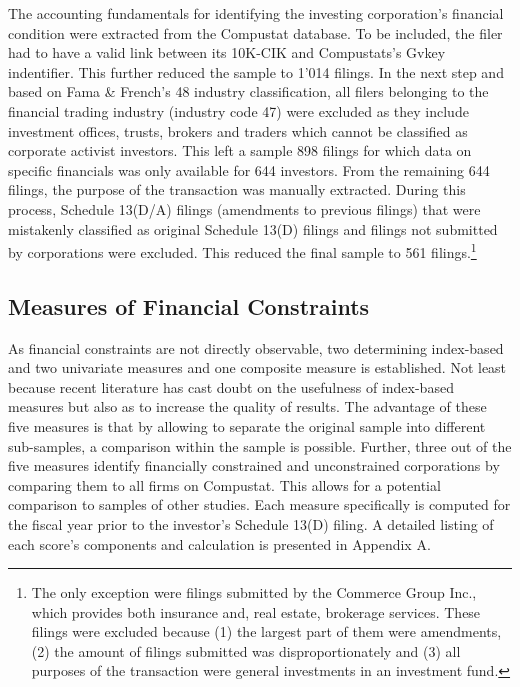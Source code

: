 \documentclass[12pt]{article}
\begin{document}
The accounting fundamentals for identifying the investing corporation's financial condition were extracted from the Compustat database. To be included, the filer had to have a valid link between its 10K-CIK and Compustats's Gvkey indentifier. This further reduced the sample to 1'014 filings. In the next step and based on Fama \& French's 48 industry classification, all filers belonging to the financial trading industry (industry code 47) were excluded as they include investment offices, trusts, brokers and traders which cannot be classified as corporate activist investors. This left a sample 898 filings for which data on specific financials was only available for 644 investors. From the remaining 644 filings, the purpose of the transaction was manually extracted. During this process, Schedule 13(D/A) filings (amendments to previous filings) that were mistakenly classified as original Schedule 13(D) filings and filings not submitted by corporations were excluded. This reduced the final sample to 561 filings.\footnote{The only exception were filings submitted by the Commerce Group Inc., which provides both insurance and, real estate, brokerage services. These filings were excluded because (1) the largest part of them were amendments, (2) the amount of filings submitted was disproportionately and (3) all purposes of the transaction were general investments in an investment fund.} 

\subsection{Measures of Financial Constraints}

As financial constraints are not directly observable, two determining index-based and two univariate measures and one composite measure is established. Not least because recent literature has cast doubt on the usefulness \citep[p.109]{Khatami2014} of index-based measures but also as to increase the quality of results. The advantage of these five measures is that by allowing to separate the original sample into different sub-samples, a comparison within the sample is possible. Further, three out of the five measures identify financially constrained and unconstrained corporations by comparing them to all firms on Compustat. This allows for a potential comparison to samples of other studies. Each measure specifically is computed for the fiscal year prior to the investor's Schedule 13(D) filing. A detailed listing of each score's components and calculation is presented in Appendix A.
\end{document}
